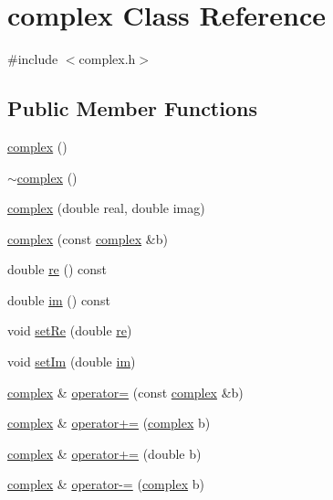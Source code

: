 \hypertarget{classcomplex}{}\section{complex Class Reference}
\label{classcomplex}


{\ttfamily \#include $<$complex.\+h$>$}

\subsection*{Public Member Functions}
\begin{DoxyCompactItemize}
\item 
\mbox{\hyperlink{classcomplex_a1fb8d3affbc54c1ad34a0820b357e194}{complex}} ()
\item 
\mbox{\hyperlink{classcomplex_abd31d1c53fe873fa4ec0fbce50601485}{$\sim$complex}} ()
\item 
\mbox{\hyperlink{classcomplex_ab8d6f234864954c1ab460984a1e32bd3}{complex}} (double real, double imag)
\item 
\mbox{\hyperlink{classcomplex_a57fa59491a94c3aeeb5b005fed5d0ed4}{complex}} (const \mbox{\hyperlink{classcomplex}{complex}} \&b)
\item 
double \mbox{\hyperlink{classcomplex_a696019188accc543e7c8297595e297ec}{re}} () const
\item 
double \mbox{\hyperlink{classcomplex_a450461dea92da7f72b96402edafd07c2}{im}} () const
\item 
void \mbox{\hyperlink{classcomplex_a360f0c3963a8e654ccbc16712294f4d7}{set\+Re}} (double \mbox{\hyperlink{classcomplex_a696019188accc543e7c8297595e297ec}{re}})
\item 
void \mbox{\hyperlink{classcomplex_aa4c37b87b5b9beebddad476b3049394c}{set\+Im}} (double \mbox{\hyperlink{classcomplex_a450461dea92da7f72b96402edafd07c2}{im}})
\item 
\mbox{\hyperlink{classcomplex}{complex}} \& \mbox{\hyperlink{classcomplex_a83c122535af669e7f331d71de550e9ba}{operator=}} (const \mbox{\hyperlink{classcomplex}{complex}} \&b)
\item 
\mbox{\hyperlink{classcomplex}{complex}} \& \mbox{\hyperlink{classcomplex_a8430406d485ddd82907b89aa38dfac18}{operator+=}} (\mbox{\hyperlink{classcomplex}{complex}} b)
\item 
\mbox{\hyperlink{classcomplex}{complex}} \& \mbox{\hyperlink{classcomplex_ae776ea1bee9bed9540597a671abc3953}{operator+=}} (double b)
\item 
\mbox{\hyperlink{classcomplex}{complex}} \& \mbox{\hyperlink{classcomplex_af797416b6b4b45c2bb54958fcd076a0e}{operator-\/=}} (\mbox{\hyperlink{classcomplex}{complex}} b)

\end{DoxyCompactItemize}
